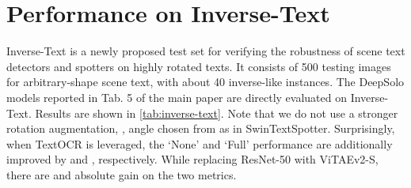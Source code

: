 \documentclass[10pt,twocolumn,letterpaper]{article}
\begin{document}
\begin{table}[!t]
\section{Performance on Inverse-Text}
Inverse-Text \cite{ye2022dptext} is a newly proposed test set for verifying the robustness of scene text detectors and spotters on highly rotated texts. It consists of 500 testing images for arbitrary-shape scene text, with about 40 inverse-like instances. The DeepSolo models reported in Tab. 5 of the main paper are directly evaluated on Inverse-Text. Results are shown in \cref{tab:inverse-text}. Note that we do not use a stronger rotation augmentation, \eg, angle chosen from  as in SwinTextSpotter. Surprisingly, when TextOCR is leveraged, the ‘None' and ‘Full' performance are additionally improved by  and , respectively. While replacing ResNet-50 with ViTAEv2-S, there are  and  absolute gain on the two metrics.

\begin{table*}[!t]
\centering
\setlength{\tabcolsep}{2pt}
\caption{Training details of DeepSolo with ResNet. ``Step'' denotes the iteration step where the learning rate is divided by 10.}
\label{tab:resnet}
\end{table*}


\end{table}
\end{document}
